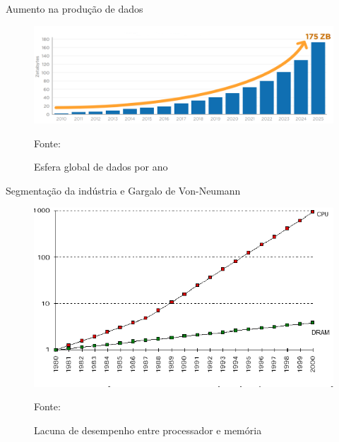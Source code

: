 \begin{frame}{Aumento na produção de dados}
	\begin{figure}[h!]
        \centering
        \includegraphics[width=\columnwidth]{images/relatorio-idc.png}
        
        \caption{Esfera global de dados por ano}
        \footnotesize{Fonte: \cite{relatorio-idc}}
    \end{figure} 
\end{frame}

\begin{frame}{Segmentação da indústria e Gargalo de Von-Neumann }

	\begin{figure}[h!]
        \centering
        \includegraphics[scale=0.42]{images/gap-processor-memory.png}
        
        \caption{Lacuna de desempenho entre processador e memória}
        \footnotesize{Fonte: \cite{fig-gap-processor-memory}}
    \end{figure} 
\end{frame}

